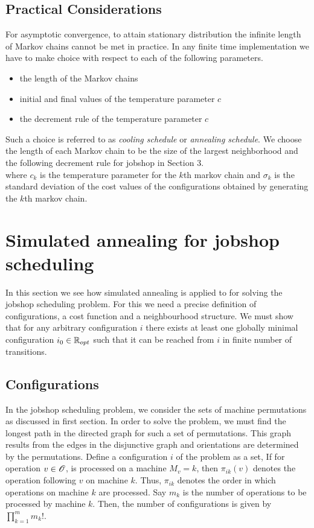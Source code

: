 \documentclass[letterpaper,english,10pt]{article}
\begin{document}
\subsection{Practical Considerations}
For asymptotic convergence, to attain stationary distribution the infinite length of Markov chains cannot be met in practice. In any finite time implementation we have to make choice with respect to each of the following parameters.

\begin{itemize}
\item the length of the Markov chains
\item initial and final values of the temperature parameter $c$
\item the decrement rule of the temperature parameter $c$
\end{itemize}
Such a choice is referred to as \textit{cooling schedule} or \textit{annealing schedule}. We choose the length of each Markov chain to be the size of the largest neighborhood and the following decrement rule for jobshop in Section 3.\\
where $c_k$ is the temperature parameter for the $k$th markov chain and $\sigma_k$ is the standard deviation of the cost values of the configurations obtained by generating the $k$th markov chain.

\section{Simulated annealing for jobshop scheduling}
In this section we see how simulated annealing is applied to for solving the jobshop scheduling problem. 
For this we need a precise definition of configurations, a cost function and a neighbourhood structure. 
We must show that for any arbitrary configuration $i$ there exists at least one globally minimal configuration $i_0 \in \mathbb{R}_{opt}$ such that it can be reached from $i$ in finite number of transitions.
\subsection{Configurations}
In the jobshop scheduling problem, we consider the sets of machine permutations as discussed in first section. In order to solve the problem, we must find the longest path in the directed graph for such a set of permutations. This graph results from the edges in the disjunctive graph and orientations are determined by the permutations.
Define a configuration $i$ of the problem as a set,
If for operation $v \in \mathscr{O}$, is processed on a machine $M_v = k$, then $\pi_{ik}(v)$  denotes the operation following $v$ on machine $k$. Thus, $\pi_{ik}$ denotes the order in which operations on machine $k$ are processed. Say $m_k$ is the number of operations to be processed by machine $k$. Then, the number of configurations is given by $\prod_{k=1}^{m}m_k!$.
\end{document}
